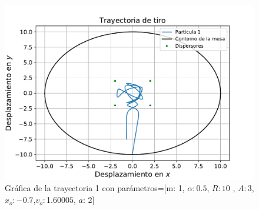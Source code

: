 \documentclass[11pt,letterpaper,twocolumn]{article}
\begin{document}
\begin{figure}[H]
\centering 
\includegraphics[scale=0.5]{g1.pdf}
\caption{Gráfica de la trayectoria 1 con parámetros=[m: 1, $\alpha: 0$.$5$, $R: 10$ , $A: 3$, $ x_{o}: -0$.$7$,$ v_{o}: $1.$60005$, $a$: 2]} 
\label{f1}
\end{figure}  
\end{document}
